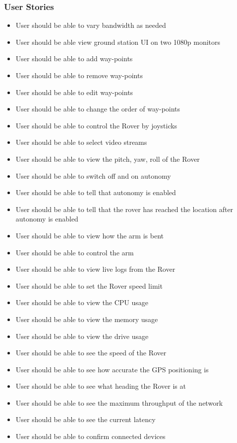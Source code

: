 \documentclass[onecolumn, draftclsnofoot, 10pt, compsoc]{IEEEtran}
\begin{document}
\subsubsection{User Stories}
\begin{itemize}
\item User should be able to vary bandwidth as needed
\item User should be able view ground station UI on two 1080p monitors
\item User should be able to add way-points
\item User should be able to remove way-points
\item User should be able to edit way-points
\item User should be able to change the order of way-points
\item User should be able to control the Rover by joysticks
\item User should be able to select video streams
\item User should be able to view the pitch, yaw, roll of the Rover
\item User should be able to switch off and on autonomy
\item User should be able to tell that autonomy is enabled
\item User should be able to tell that the rover has reached the location after autonomy is enabled
\item User should be able to view how the arm is bent
\item User should be able to control the arm
\item User should be able to view live logs from the Rover
\item User should be able to set the Rover speed limit
\item User should be able to view the CPU usage
\item User should be able to view the memory usage
\item User should be able to view the drive usage
\item User should be able to see the speed of the Rover
\item User should be able to see how accurate the GPS positioning is
\item User should be able to see what heading the Rover is at
\item User should be able to see the maximum throughput of the network
\item User should be able to see the current latency
\item User should be able to confirm connected devices
\end{itemize}
\end{document}
